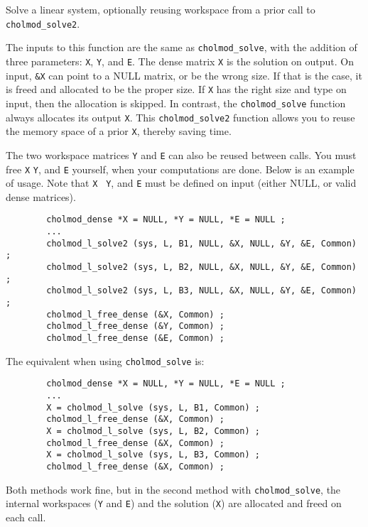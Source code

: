 \documentclass[11pt]{article}
\begin{document}

Solve a linear system, optionally reusing workspace from a prior call
to {\tt cholmod\_solve2}.

The inputs to this function are the same as {\tt cholmod\_solve}, with the
addition of three parameters: {\tt X}, {\tt Y}, and {\tt E}.  The dense matrix
{\tt X} is the solution on output.  On input, {\tt \&X} can point to a NULL
matrix, or be the wrong size.  If that is the case, it is freed and allocated
to be the proper size.  If {\tt X} has the right size and type on input, then
the allocation is skipped.  In contrast, the {\tt cholmod\_solve} function
always allocates its output {\tt X}.  This {\tt cholmod\_solve2} function
allows you to reuse the memory space of a prior {\tt X}, thereby saving time.

The two workspace matrices {\tt Y} and {\tt E} can also be reused between
calls.  You must free {\tt X} {\tt Y}, and {\tt E} yourself, when your
computations are done.  Below is an example of usage.  Note that {\tt X} {\tt
Y}, and {\tt E} must be defined on input (either NULL, or valid dense
matrices).

\begin{verbatim}
        cholmod_dense *X = NULL, *Y = NULL, *E = NULL ;
        ...
        cholmod_l_solve2 (sys, L, B1, NULL, &X, NULL, &Y, &E, Common) ;
        cholmod_l_solve2 (sys, L, B2, NULL, &X, NULL, &Y, &E, Common) ;
        cholmod_l_solve2 (sys, L, B3, NULL, &X, NULL, &Y, &E, Common) ;
        cholmod_l_free_dense (&X, Common) ;
        cholmod_l_free_dense (&Y, Common) ;
        cholmod_l_free_dense (&E, Common) ;
\end{verbatim}

The equivalent when using {\tt cholmod\_solve} is:

\begin{verbatim}
        cholmod_dense *X = NULL, *Y = NULL, *E = NULL ;
        ...
        X = cholmod_l_solve (sys, L, B1, Common) ;
        cholmod_l_free_dense (&X, Common) ;
        X = cholmod_l_solve (sys, L, B2, Common) ;
        cholmod_l_free_dense (&X, Common) ;
        X = cholmod_l_solve (sys, L, B3, Common) ;
        cholmod_l_free_dense (&X, Common) ;
\end{verbatim}

Both methods work fine, but in the second method with {\tt cholmod\_solve}, the
internal workspaces ({\tt Y} and {\tt E}) and the solution ({\tt X}) are
allocated and freed on each call.
\end{document}
